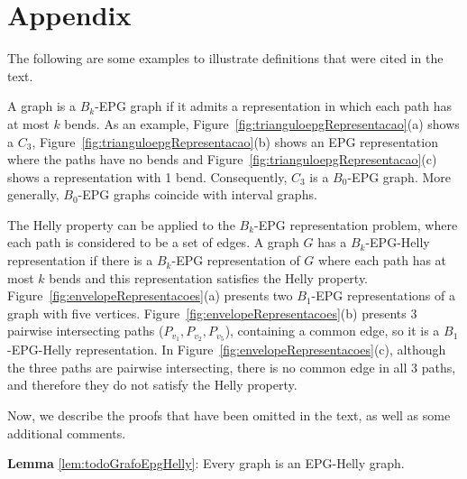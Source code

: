 \documentclass[runningheads]{llncs}
\begin{document}
\newpage

\section*{Appendix}

The following are some examples to illustrate definitions that were cited in the text.

A graph is a $ B_k$-EPG graph if it admits a representation in which each path has at most $k$ bends. As an example, Figure~\ref{fig:trianguloepgRepresentacao}(a) shows a $C_3$, Figure~\ref{fig:trianguloepgRepresentacao}(b) shows an EPG representation where the paths have no bends and Figure~\ref{fig:trianguloepgRepresentacao}(c) shows a representation with 1 bend.   
 Consequently, $C_3$ is a $B_0$-EPG graph. More generally, $B_0$-EPG graphs coincide with interval graphs.



The Helly property can be applied to the $ B_k $-EPG representation problem, where each path is considered to be a set of edges. A graph $ G $ has a  $ B_k$-EPG-Helly representation if there is a $ B_k $-EPG representation of $G$ where each path has at most $ k $ bends and this representation satisfies the Helly property. 
 Figure~\ref{fig:envelopeRepresentacoes}(a) presents two $B_1$-EPG representations of a graph with five vertices.  Figure~\ref{fig:envelopeRepresentacoes}(b)   presents 3 pairwise intersecting paths ($P_{v_1}, P_{v_2}, P_{v_5}$), containing a common edge, so it is a $ B_1$-EPG-Helly representation. In Figure~\ref{fig:envelopeRepresentacoes}(c), although the three paths are pairwise intersecting, there is no common edge in all 3 paths, and therefore they do not satisfy the Helly property. 




Now, we describe the proofs that have been omitted in the text, as well as some additional comments.


\begin{lemma*} \textbf{Lemma} \ref{lem:todoGrafoEpgHelly}:
 Every graph is an EPG-Helly graph.
 \end{lemma*}
 
\end{document}
